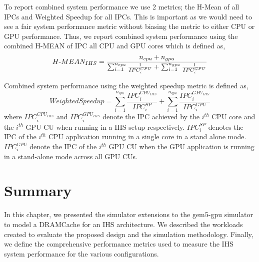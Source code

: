 \par To report combined system performance we use 2 metrics; the H-Mean of all IPCs and Weighted Speedup for all IPCs. This is important as we would need to see a fair system performance metric without biasing the metric to either CPU or GPU performance. Thus, we report combined system performance using the combined H-MEAN of IPC all CPU and GPU cores which is defined as,
{
\begin{equation*}
H\textnormal{-}MEAN_{IHS} = \frac{n_{cpu}+ n_{gpu}}{\sum_{i=1}^{n_{cpu}} \frac{1}{IPC_{i}^{CPU}} + \sum_{i=1}^{n_{gpu}} \frac{1}{IPC_{i}^{GPU}}} 
\end{equation*}
}
\par Combined system performance using the weighted speedup metric \cite{weighted-speedup} is defined as,
{
\begin{equation*}
Weighted Speedup = \sum_{i=1}^{n_{cpu}} \frac{IPC_i^{CPU_{IHS}}}{IPC_i^{SP}} + \sum_{i=1}^{n_{gpu}} \frac{IPC_i^{GPU_{IHS}}}{IPC_i^{GPU}}
\end{equation*}
}
where ${IPC_i^{CPU_{IHS}}}$ and $IPC_i^{GPU_{IHS}}$ denote the IPC achieved by the $i^{th}$ CPU core and the $i^{th}$ GPU CU when running in a IHS setup respectively. $IPC_i^{SP}$ denotes the IPC of the $i^{th}$ CPU application running in a single core in a stand alone mode. $IPC_i^{GPU}$ denote the IPC of the $i^{th}$ GPU CU when the GPU application is running in a stand-alone mode across all GPU CUs. 

\section{Summary}
In this chapter, we presented the simulator extensions to the gem5-gpu simulator to model a DRAMCache for an IHS architecture. We described the workloads created to evaluate the proposed design and the simulation methodology. Finally, we define the comprehensive performance metrics used to measure the IHS system performance for the various configurations.

